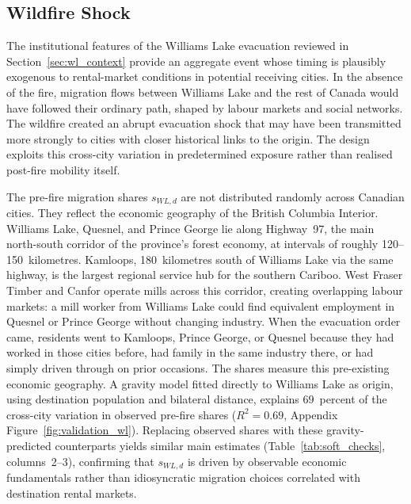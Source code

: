 \documentclass[12pt]{article}
\begin{document}
\subsection{Wildfire Shock}

The institutional features of the Williams Lake evacuation reviewed in
Section~\ref{sec:wl_context} provide an aggregate event whose timing is
plausibly exogenous to rental-market conditions in potential receiving cities.
In the absence of the fire, migration flows between Williams Lake and the rest
of Canada would have followed their ordinary path, shaped by labour markets and
social networks. The wildfire created an abrupt evacuation shock that may have
been transmitted more strongly to cities with closer historical links to the
origin. The design exploits this cross-city variation in predetermined exposure
rather than realised post-fire mobility itself.

The pre-fire migration shares $s_{WL,d}$ are not distributed randomly across
Canadian cities. They reflect the economic geography of the British Columbia
Interior. Williams Lake, Quesnel, and Prince George lie along Highway~97, the
main north-south corridor of the province's forest economy, at intervals of
roughly 120--150~kilometres. Kamloops, 180~kilometres south of Williams Lake
via the same highway, is the largest regional service hub for the southern
Cariboo. West Fraser Timber and Canfor operate mills across this corridor,
creating overlapping labour markets: a mill worker from Williams Lake could
find equivalent employment in Quesnel or Prince George without changing
industry. When the evacuation order came, residents went to Kamloops, Prince
George, or Quesnel because they had worked in those cities before, had family
in the same industry there, or had simply driven through on prior occasions.
The shares measure this pre-existing economic geography. A gravity model fitted
directly to Williams Lake as origin, using destination population and bilateral
distance, explains $69$~percent of the cross-city variation in observed pre-fire
shares ($R^{2}=0.69$, Appendix Figure~\ref{fig:validation_wl}). Replacing observed
shares with these gravity-predicted counterparts yields similar main estimates
(Table~\ref{tab:soft_checks}, columns~2--3), confirming that $s_{WL,d}$ is driven by
observable economic fundamentals rather than idiosyncratic migration choices
correlated with destination rental markets.

\end{document}
